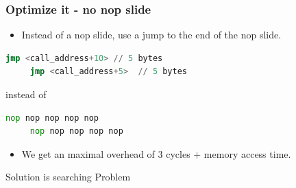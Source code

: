 \documentclass{beamer}
\begin{document}
\begin{frame}[fragile]\frametitle{Optimize it - no nop slide}

  \begin{itemize}
  \item Instead of a nop slide, use a jump to the end of the nop slide.
  \end{itemize}

\begin{lstlisting}[language=asm]
     jmp <call_address+10> // 5 bytes
     jmp <call_address+5>  // 5 bytes
\end{lstlisting}
instead of
\begin{center}
  \begin{lstlisting}[language=asm]
     nop nop nop nop nop 
     nop nop nop nop nop
  \end{lstlisting}
\end{center}

\begin{itemize}
\item We get an maximal overhead of 3 cycles + memory access time.
\end{itemize}

\end{frame}

\begin{frame}
\begin{center}
\huge\alert{Solution is searching Problem}
\end{center}
\end{frame}
\end{document}
